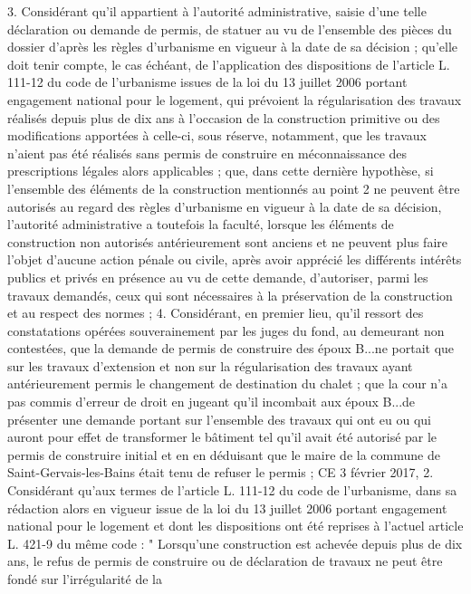 \documentclass[11pt,a4paper]{report}
\begin{document}
	3. Considérant qu'il appartient à l'autorité administrative, saisie d'une telle déclaration ou demande de permis,
	de statuer au vu de l'ensemble des pièces du dossier d'après les règles d'urbanisme en vigueur à la date de sa
	décision ; qu'elle doit tenir compte, le cas échéant, de l'application des dispositions de l'article L. 111-12 du
	code de l'urbanisme issues de la loi du 13 juillet 2006 portant engagement national pour le logement, qui
	prévoient la régularisation des travaux réalisés depuis plus de dix ans à l'occasion de la construction primitive
	ou des modifications apportées à celle-ci, sous réserve, notamment, que les travaux n'aient pas été réalisés sans
	permis de construire en méconnaissance des prescriptions légales alors applicables ; que, dans cette dernière
	hypothèse, si l'ensemble des éléments de la construction mentionnés au point 2 ne peuvent être autorisés au
	regard des règles d'urbanisme en vigueur à la date de sa décision, l'autorité administrative a toutefois la faculté,
	lorsque les éléments de construction non autorisés antérieurement sont anciens et ne peuvent plus faire l'objet
	d'aucune action pénale ou civile, après avoir apprécié les différents intérêts publics et privés en présence au vu
	de cette demande, d'autoriser, parmi les travaux demandés, ceux qui sont nécessaires à la préservation de la
	construction et au respect des normes ;
	4. Considérant, en premier lieu, qu'il ressort des constatations opérées souverainement par les juges du fond, au
	demeurant non contestées, que la demande de permis de construire des époux B...ne portait que sur les travaux
	d'extension et non sur la régularisation des travaux ayant antérieurement permis le changement de destination
	du chalet ; que la cour n'a pas commis d'erreur de droit en jugeant qu'il incombait aux époux B...de présenter
	une demande portant sur l'ensemble des travaux qui ont eu ou qui auront pour effet de transformer le bâtiment
	tel qu'il avait été autorisé par le permis de construire initial et en en déduisant que le maire de la commune de
	Saint-Gervais-les-Bains était tenu de refuser le permis ;
	CE 3 février 2017, 
	2. Considérant qu'aux termes de l'article L. 111-12 du code de l'urbanisme, dans sa rédaction alors en vigueur
	issue de la loi du 13 juillet 2006 portant engagement national pour le logement et dont les dispositions ont été
	reprises à l'actuel article L. 421-9 du même code : " Lorsqu'une construction est achevée depuis plus de dix ans,
	le refus de permis de construire ou de déclaration de travaux ne peut être fondé sur l'irrégularité de la
\end{document}
